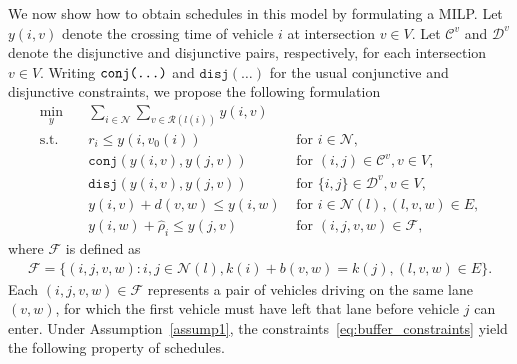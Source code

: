 \documentclass{article}
\theoremstyle{definition}
\theoremstyle{plain}
\begin{document}
We now show how to obtain schedules in this model by formulating a MILP.
Let $y(i,v)$ denote the crossing time of vehicle $i$ at intersection $v \in V$.
Let $\mathcal{C}^{v}$ and $\mathcal{D}^{v}$ denote the disjunctive and disjunctive pairs, respectively, for each intersection $v \in V$.
%
Writing $\texttt{conj(\dots)}$ and $\texttt{disj}(\dots)$ for the usual conjunctive and disjunctive
constraints, we propose the following formulation
\begin{subequations}\label{eq:network_problem}
\begin{align}
  \min_{y} \quad & \sum_{i \in \mathcal{N}} \sum_{v \in \mathcal{R}(l(i))} y(i,v) & \\
  \text{s.t.} \quad & r_{i} \leq y(i, v_{0}(i)) & \text{ for } i \in \mathcal{N} , \\
  & \texttt{conj}(y(i,v), y(j,v)) & \text{ for } (i,j) \in \mathcal{C}^{v}, v \in V , \\
  & \texttt{disj}(y(i,v), y(j,v)) & \text{ for } \{i,j\} \in \mathcal{D}^{v}, v \in V , \\
  & y(i, v) + d(v, w) \leq y(i, w) & \text{ for } i \in \mathcal{N}(l), (l, v, w) \in E, \\
  & y(i, w) + \hat{\rho}_{i} \leq y(j, v) & \text{ for } (i,j,v,w) \in \mathcal{F} , \label{eq:buffer_constraints}
\end{align}
\end{subequations}
where $\mathcal{F}$ is defined as
\begin{align*}
  \mathcal{F} = \{ (i,j,v,w) : i,j \in \mathcal{N}(l), k(i) + b(v,w) = k(j),  (l,v,w) \in E\} .
\end{align*}
Each $(i,j,v,w) \in \mathcal{F}$ represents a pair of vehicles driving on the same
lane $(v,w)$, for which the first vehicle must have left that lane before vehicle
$j$ can enter.
%
Under Assumption~\ref{assump1}, the constraints~\eqref{eq:buffer_constraints} yield the
following property of schedules.
\end{document}
